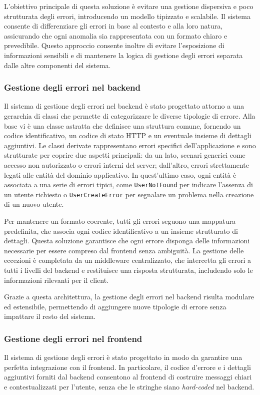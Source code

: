L'obiettivo principale di questa soluzione è evitare una gestione dispersiva e poco strutturata degli errori, introducendo un modello tipizzato e scalabile. Il sistema consente di differenziare gli errori in base al contesto e alla loro natura, assicurando che ogni anomalia sia rappresentata con un formato chiaro e prevedibile. Questo approccio consente inoltre di evitare l'esposizione di informazioni sensibili e di mantenere la logica di gestione degli errori separata dalle altre componenti del sistema.

\subsubsection{Gestione degli errori nel backend}
Il sistema di gestione degli errori nel backend è stato progettato attorno a una gerarchia di classi che permette di categorizzare le diverse tipologie di errore. Alla base vi è una classe astratta che definisce una struttura comune, fornendo un codice identificativo, un codice di stato HTTP e un eventuale insieme di dettagli aggiuntivi. Le classi derivate rappresentano errori specifici dell’applicazione e sono strutturate per coprire due aspetti principali: da un lato, scenari generici come accesso non autorizzato o errori interni del server; dall’altro, errori strettamente legati alle entità del dominio applicativo. In quest’ultimo caso, ogni entità è associata a una serie di errori tipici, come \texttt{UserNotFound} per indicare l’assenza di un utente richiesto o \texttt{UserCreateError} per segnalare un problema nella creazione di un nuovo utente.

Per mantenere un formato coerente, tutti gli errori seguono una mappatura predefinita, che associa ogni codice identificativo a un insieme strutturato di dettagli. Questa soluzione garantisce che ogni errore disponga delle informazioni necessarie per essere compreso dal frontend senza ambiguità. La gestione delle eccezioni è completata da un middleware centralizzato, che intercetta gli errori a tutti i livelli del backend e restituisce una risposta strutturata, includendo solo le informazioni rilevanti per il client.

Grazie a questa architettura, la gestione degli errori nel backend risulta modulare ed estensibile, permettendo di aggiungere nuove tipologie di errore senza impattare il resto del sistema.

\subsubsection{Gestione degli errori nel frontend}
Il sistema di gestione degli errori è stato progettato in modo da garantire una perfetta integrazione con il frontend. In particolare, il codice d'errore e i dettagli aggiuntivi forniti dal backend consentono al frontend di costruire messaggi chiari e contestualizzati per l'utente, senza che le stringhe siano \textit{hard-coded} nel backend.


